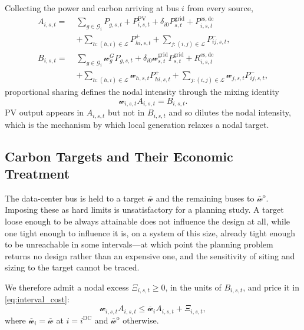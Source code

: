 \documentclass[journal]{IEEEtran}
\begin{document}
Collecting the power and carbon arriving at bus $i$ from every source,
\begin{align}
A_{i,s,t}
=\;&\sum_{g\in\mathcal{G}_i}P_{g,s,t}
+P_{i,s,t}^{\mathrm{PV}}
+\delta_{i0}P_{s,t}^{\mathrm{grid}}
+P_{i,s,t}^{\mathrm{es,dc}}
\nonumber\\
&+\!\!\sum_{h:(h,i)\in\mathcal{L}}\!\!P_{hi,s,t}^{+}
+\!\!\sum_{j:(i,j)\in\mathcal{L}}\!\!P_{ij,s,t}^{-},
\label{eq:incoming_power}\\
B_{i,s,t}
=\;&\sum_{g\in\mathcal{G}_i}\mathscr{w}_{g}^{G}P_{g,s,t}
+\delta_{i0}\mathscr{w}_{s,t}^{\mathrm{grid}}P_{s,t}^{\mathrm{grid}}
+R_{i,s,t}^{\mathrm{es,dc}}
\nonumber\\
&+\!\!\sum_{h:(h,i)\in\mathcal{L}}\!\!\mathscr{w}_{h,s,t}P_{hi,s,t}^{+}
+\!\!\sum_{j:(i,j)\in\mathcal{L}}\!\!\mathscr{w}_{j,s,t}P_{ij,s,t}^{-},
\label{eq:incoming_carbon}
\end{align}
proportional sharing \cite{chen2025copf} defines the nodal intensity
through the mixing identity
\begin{equation}
\mathscr{w}_{i,s,t}A_{i,s,t}=B_{i,s,t}.
\label{eq:nodal_mixing}
\end{equation}
PV output appears in $A_{i,s,t}$ but not in $B_{i,s,t}$ and so dilutes
the nodal intensity, which is the mechanism by which local generation
relaxes a nodal target.

\subsection{Carbon Targets and Their Economic Treatment}
\label{sec:carbon_target}

The data-center bus is held to a target $\overline{\mathscr{w}}$ and the
remaining buses to $\overline{\mathscr{w}}^{\mathrm{o}}$. Imposing these
as hard limits is unsatisfactory for a planning study. A target loose
enough to be always attainable does not influence the design at all,
while one tight enough to influence it is, on a system of this size,
already tight enough to be unreachable in some intervals---at which point
the planning problem returns no design rather than an expensive one, and
the sensitivity of siting and sizing to the target cannot be traced.

We therefore admit a nodal excess $\Xi_{i,s,t}\geq0$, in the units of
$B_{i,s,t}$, and price it in \eqref{eq:interval_cost}:
\begin{equation}
\mathscr{w}_{i,s,t}A_{i,s,t}
\leq
\overline{\mathscr{w}}_iA_{i,s,t}+\Xi_{i,s,t},
\label{eq:nodal_carbon_target}
\end{equation}
where $\overline{\mathscr{w}}_i=\overline{\mathscr{w}}$ at
$i=i^{\mathrm{DC}}$ and $\overline{\mathscr{w}}^{\mathrm{o}}$ otherwise.
\end{document}
